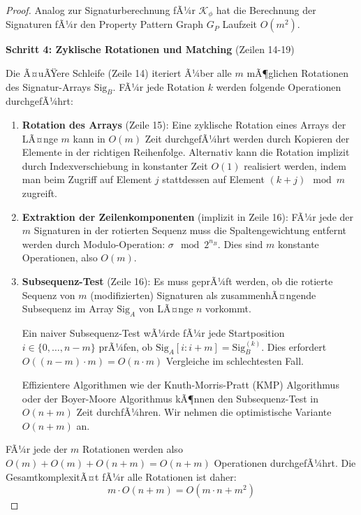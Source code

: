 ﻿\documentclass[a4paper,12pt]{article}
\theoremstyle{definition}
\begin{document}
\begin{proof}
Analog zur Signaturberechnung fÃ¼r $\mathcal{K}_{\phi}$ hat die Berechnung der Signaturen fÃ¼r den Property Pattern Graph $G_P$ Laufzeit $O(m^2)$.

\textbf{Schritt 4: Zyklische Rotationen und Matching} (Zeilen 14-19)

Die Ã¤uÃŸere Schleife (Zeile 14) iteriert Ã¼ber alle $m$ mÃ¶glichen Rotationen des Signatur-Arrays $\text{Sig}_B$. FÃ¼r jede Rotation $k$ werden folgende Operationen durchgefÃ¼hrt:

\begin{enumerate}
\item \textbf{Rotation des Arrays} (Zeile 15): Eine zyklische Rotation eines Arrays der LÃ¤nge $m$ kann in $O(m)$ Zeit durchgefÃ¼hrt werden durch Kopieren der Elemente in der richtigen Reihenfolge. Alternativ kann die Rotation implizit durch Indexverschiebung in konstanter Zeit $O(1)$ realisiert werden, indem man beim Zugriff auf Element $j$ stattdessen auf Element $(k+j) \mod m$ zugreift.

\item \textbf{Extraktion der Zeilenkomponenten} (implizit in Zeile 16): FÃ¼r jede der $m$ Signaturen in der rotierten Sequenz muss die Spaltengewichtung entfernt werden durch Modulo-Operation: $\sigma \mod 2^{n_B}$. Dies sind $m$ konstante Operationen, also $O(m)$.

\item \textbf{Subsequenz-Test} (Zeile 16): Es muss geprÃ¼ft werden, ob die rotierte Sequenz von $m$ (modifizierten) Signaturen als zusammenhÃ¤ngende Subsequenz im Array $\text{Sig}_A$ von LÃ¤nge $n$ vorkommt.

Ein naiver Subsequenz-Test wÃ¼rde fÃ¼r jede Startposition $i \in \{0, \ldots, n-m\}$ prÃ¼fen, ob $\text{Sig}_A[i:i+m] = \text{Sig}_B^{(k)}$. Dies erfordert $O((n-m) \cdot m) = O(n \cdot m)$ Vergleiche im schlechtesten Fall.

Effizientere Algorithmen wie der Knuth-Morris-Pratt (KMP) Algorithmus oder der Boyer-Moore Algorithmus kÃ¶nnen den Subsequenz-Test in $O(n + m)$ Zeit durchfÃ¼hren. Wir nehmen die optimistische Variante $O(n + m)$ an.
\end{enumerate}

FÃ¼r jede der $m$ Rotationen werden also $O(m) + O(m) + O(n+m) = O(n+m)$ Operationen durchgefÃ¼hrt. Die GesamtkomplexitÃ¤t fÃ¼r alle Rotationen ist daher:
\begin{equation}
m \cdot O(n+m) = O(m \cdot n + m^2)
\end{equation}


\end{proof}
\end{document}
